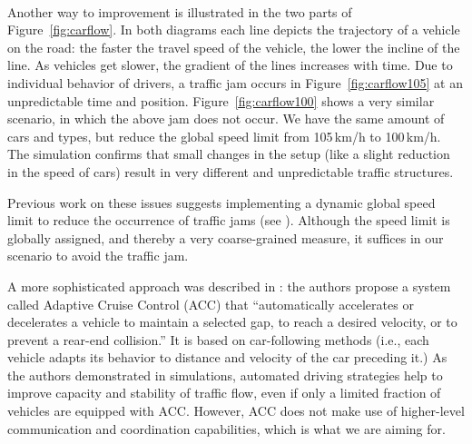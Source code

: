 \documentclass{acmrip}
\newcommand{\figref}[1]{Figure~\ref{fig:#1}}
\begin{document}
\begin{figure*}[!t]
        \begin{center}
                \mbox
                {
           \quad
                }

          \caption{\small Illustration of vehicle flow over time (traffic density $\rho=30$\,veh/km). \figref{carflow105} shows a traffic jam that emerges from local disturbances, with a speed limit of 105\,km/h. Limiting the maximum speed by just 5\,km/h to 100\,km/h will avoid the traffic jam, as depicted in \figref{carflow100}.}
\label{fig:carflow}

        \end{center}
\end{figure*}



Another way to improvement is illustrated in the two parts of \figref{carflow}.
In both diagrams each line depicts the trajectory of a vehicle on the road: the
faster the travel speed of the vehicle, the lower the incline of the line. As
vehicles get slower, the gradient of the lines increases with time.
Due to individual behavior of drivers, a traffic jam occurs in
\figref{carflow105} at an unpredictable time and position.
\figref{carflow100} shows a very similar scenario, in which the
above jam does not occur. We have the same amount of cars and types,
but reduce the global speed limit from 105\,km/h to 100\,km/h. The
simulation confirms that small changes in the setup (like a slight
reduction in the speed of cars) result in very different and
unpredictable traffic structures.

Previous work on these issues suggests implementing a dynamic global
speed limit to reduce the occurrence of traffic jams (see
\cite{treiber-2001-49}). Although the speed limit is globally
assigned, and thereby a very coarse-grained measure, it suffices in
our scenario to avoid the traffic jam.

A more sophisticated approach was described in
\cite{ktsfh-jaacciiotd-05}: the authors propose a system called
Adaptive Cruise Control (ACC) that
    ``automatically accelerates or decelerates a vehicle to
    maintain a selected gap, to reach a desired velocity, or to
prevent a rear-end collision.'' It is based on car-following methods
(i.e., each vehicle adapts its behavior to distance and velocity of
the car preceding it.) As the authors demonstrated in simulations,
automated driving strategies help to improve capacity and stability
of traffic flow, even if only a limited fraction of vehicles are
equipped with ACC. However,
ACC does not make use of higher-level communication and coordination
capabilities, which is what we are aiming for.
\end{document}
